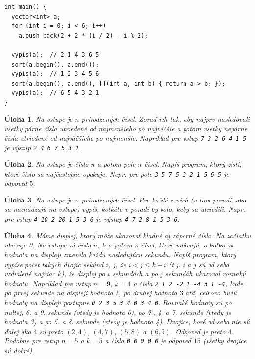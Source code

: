\documentclass[10pt]{article}
\newtheorem{uloha}{Úloha}
\begin{document}
{\begin{lstlisting}
int main() {
  vector<int> a;
  for (int i = 0; i < 6; i++)
    a.push_back(2 + 2 * (i / 2) - i % 2);

  vypis(a);  // 2 1 4 3 6 5
  sort(a.begin(), a.end());
  vypis(a);  // 1 2 3 4 5 6
  sort(a.begin(), a.end(), [](int a, int b) { return a > b; });
  vypis(a);  // 6 5 4 3 2 1
}
\end{lstlisting}

\begin{uloha}
Na vstupe je $n$ prirodzených čísel. Zoraď ich tak, aby najprv nasledovali všetky
párne čísla utriedené od najmenšieho po najväčšie a potom všetky nepárne čísla
  utriedené od najväčšieho po najmenšie. Napríklad pre vstup {\tt 7 3 2 6 4 1 5}
  je výstup {\tt 2 4 6 7 5 3 1}.
\end{uloha}

\begin{uloha}
  Na vstupe je číslo $n$ a potom pole $n$ čísel. Napíš program, ktorý zistí, ktoré číslo
  sa najčastejšie opakuje. Napr. pre pole {\tt 3 5 7 5 3 2 1 5 6 5} je odpoveď $5$.
\end{uloha}

\begin{uloha}
  Na vstupe je $n$ prirodzených čísel. Pre každé z nich (v tom poradí, ako sa
  nachádzajú na vstupe) vypíš, koľkáte v poradí by bolo, keby sa utriedili.
  Napr. pre vstup {\tt 4 10 2 20 1 5 3 6} je výstup {\tt 4 7 2 8 1 5 3 6}.
\end{uloha}

\begin{uloha}
  Máme displej, ktorý môže ukazovať kladné aj záporné čísla. Na začiatku ukazuje 0.
  Na vstupe sú čísla $n$, $k$ a potom 
  $n$ čísel, ktoré udávajú, o koľko sa hodnota na displeji zmenila
  každú nasledujúcu sekundu. Napíš program, ktorý vypíše počet takých dvojíc sekúnd
  $i$, $j$, že $i<j\le k+i$ (t.j. $i$ a $j$ sú od seba vzdialené najviac $k$), 
  že displej po $i$ sekundách a po $j$ sekundáh
  ukazoval rovnakú hodnotu.
  Napríklad pre vstup $n=9$, $k=4$ a čísla {\tt 2 1 2 -2 1 -4 3 1 -4},
  bude po prvej sekunde na displeji hodnota $2$, po druhej hodnota $3$ atď,
  celkovo budú hodnoty na displeji postupne {\tt 0 2 3 5 3 4 0 3 4 0}.
  Rovnaké hodnoty sú po nultej, 6. a 9. sekunde (vtedy je hodnota 0), po 2., 4. 
  a 7. sekunde (vtedy je hodnota 3) a po 5. a 8. sekunde (vtedy je hodnota 4).
  Dvojice, koré od seba nie sú ďalej ako $4$ sú preto $(2,4)$, $(4,7)$, $(5,8)$
  a $(6,9)$. Odpoveď je preto $4$. Podobne pre vstup $n=5$ a $k=5$ a čísla 
  {\tt 0 0 0 0 0} je odpoveď $15$ 
  (všetky dvojice sú dobré).
\end{uloha}

}
\end{document}
